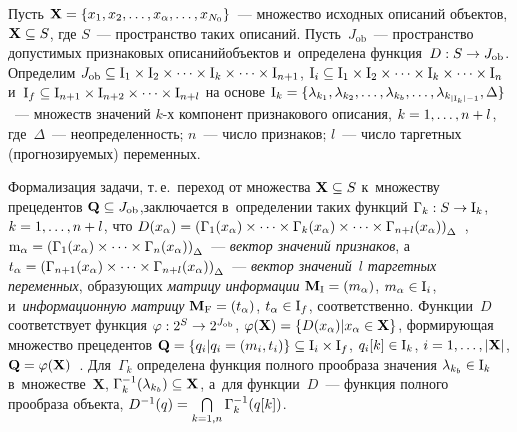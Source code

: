 \begin{multicols}{2}
     
     Пусть $\mathbf{X}\hm= \{ x_1, x_2, \ldots , x_\alpha, \ldots , x_{N_0}\}$~--- 
множество исходных описаний объектов, $\mathbf{X}\hm\subseteq 
{S}$, где ${S}$~--- пространство таких описаний. 
Пусть~${J}_{\mathrm{ob}}$~--- пространство допустимых 
признаковых описаний\linebreak объектов и~определена функция~${D}: 
{S}\hm\to {J}_{\mathrm{ob}}$. Определим 
${J}_{\mathrm{ob}}\hm\subseteq \mathrm{I}_1\times 
\mathrm{I}_2\times \cdots \times \mathrm{I}_k\times \cdots \times 
\mathrm{I}_{n+1}$, $\mathrm{I}_i\hm\subseteq \mathrm{I}_1\times 
\mathrm{I}_2\times\cdots \times \mathrm{I}_k\times \cdots \times \mathrm{I}_n$ 
и~$\mathrm{I}_f\hm\subseteq \mathrm{I}_{n+1} \times 
\mathrm{I}_{n+2}\times\cdots\times \mathrm{I}_{n+l}$ на основе 
$\mathrm{I}_k\hm= \{ \lambda_{k_1},\lambda_{k_2}, \ldots, \lambda_{k_b}, 
\ldots , \lambda_{k_{\vert \mathrm{I}_k\vert -1}}, \Delta\}$~--- множеств 
значений $k$-х компонент признакового описания, $k\hm= 1,\ldots , n\hm+l$, 
где~$\Delta$~--- неопределенность; $n$~--- чис\-ло признаков; $l$~--- число 
таргетных (прогнозируемых) переменных. 
     
     Формализация задачи, т.\,е.\ переход от множе\-ст\-ва 
$\mathbf{X}\hm\subseteq {S}$ к~множеству прецедентов 
$\mathbf{Q}\hm\subseteq {J}_{\mathrm{ob}}$,\linebreak заключается 
в~определении таких функций $\Gamma_k: {S}\hm\to \mathrm{I}_k$, 
$k\hm= 1,\ldots ,n \hm+l$, что ${D}(x_\alpha) \hm= \left( \Gamma_1(x_\alpha)\times 
\cdots \times \Gamma_k(x_\alpha)\times \cdots \times 
\Gamma_{n+l}(x_\alpha)\right)_\Delta$~\cite{5-tr, 6-tr}, $\mathrm{m}_\alpha\hm= \left( 
\Gamma_1(x_\alpha)\times \cdots \times \Gamma_n(x_\alpha)\right)_\Delta$~--- 
\textit{вектор значений признаков}, а~$t_\alpha\hm= \left( \Gamma_{n+1}(x_\alpha) \times 
\cdots\times \Gamma_{n+l}(x_\alpha)\right)_\Delta$~--- \textit{вектор значений}~$l$ 
\textit{таргетных переменных}, обра\-зу\-ющих \textit{матрицу информации} 
$\mathbf{M}_{\mathrm{I}}\hm= (m_\alpha)$, $m_\alpha\hm\in \mathrm{I}_i$, 
и~\textit{информационную матрицу} $\mathbf{M}_{\mathrm{F}}\hm= (t_\alpha)$, 
$t_\alpha\hm\in \mathrm{I}_f$, соответственно. Функции~${D}$ 
соответствует функция $\varphi: 2^{{S}}\hm\to 
2^{{J}_{\mathrm{ob}}}$, $\varphi(\mathbf{X})\hm= \left\{ 
{D}(x_\alpha)\vert x_\alpha\hm\in \mathbf{X}\right\}$, фор\-ми\-ру\-ющая 
множество прецедентов $\mathbf{Q}\hm= \{q_i\vert q_i \hm= (m_i, t_i)\} 
\hm\subseteq \mathrm{I}_i\times \mathrm{I}_f$, $q_i[k]\hm\in 
\mathrm{I}_k$, $i\hm= 1,\ldots , \vert \mathbf{X}\vert$, $\mathbf{Q}\hm= 
\varphi(\mathbf{X})$~\cite{6-tr}. Для~$\Gamma_k$ определена функция полного 
прообраза значения $\lambda_{k_b}\hm\in \mathrm{I}_k$ 
в~множестве~$\mathbf{X}$, $\Gamma^{-1}_k (\lambda_{k_b}) \hm\subseteq 
\mathbf{X}$, а~для функции~${D}$~--- функция полного прообраза 
объекта, ${D}^{-1}(q)\hm= \bigcap\limits_{k=1,n} \Gamma^{-1}_k(q[k])$. 


\end{multicols}

